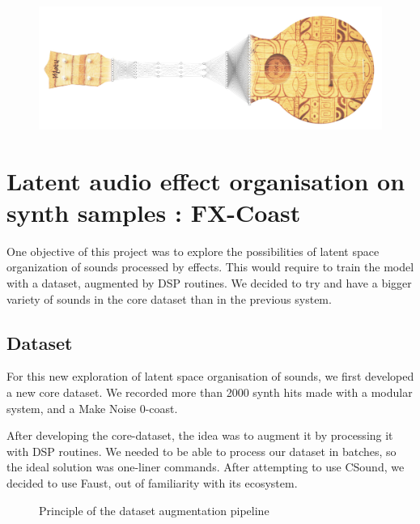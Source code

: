 \documentclass[11pt, english]{article}
\begin{document}
\begin{figure}[!h]
    \centering
    \includegraphics[width=.8\linewidth]{img/ukulelatent_petit.jpg}
\end{figure}


\section{Latent audio effect organisation on synth samples : FX-Coast}
One objective of this project was to explore the possibilities of latent space organization of sounds processed by effects. This would require to train the model with a dataset, augmented by DSP routines.
We decided to try and have a bigger variety of sounds in the core dataset than in the previous system.

\subsection{Dataset}
For this new exploration of latent space organisation of sounds, we first developed a new core dataset. We recorded more than 2000 synth hits made with a modular system, and a Make Noise 0-coast.

After developing the core-dataset, the idea was to augment it by processing it with DSP routines.
We needed to be able to process our dataset in batches, so the ideal solution was one-liner commands. After attempting to use CSound, we decided to use Faust, out of familiarity with its ecosystem.

\begin{figure}[h]
\center
{}
    \caption{Principle of the dataset augmentation pipeline}
    \label{fig:sch1}
\end{figure}
\end{document}
